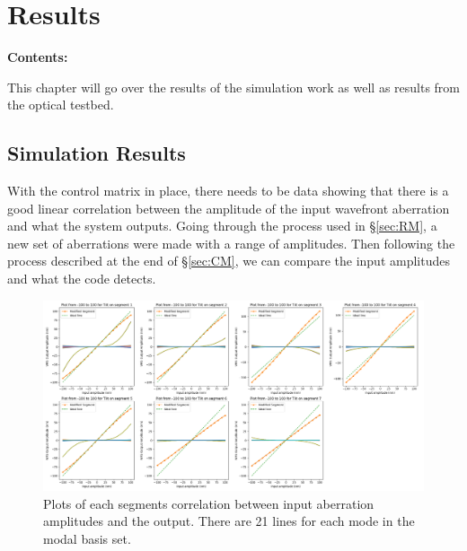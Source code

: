 \chapter{Results} %
\noindent\textbf{\large Contents:}

\noindent\hrulefill
\noindent\startcontents[chapters]
\noindent{}
\noindent\hrulefill
\label{Chapter4}


This chapter will go over the results of the simulation work as well as results from the optical testbed.

\section{Simulation Results}
\label{sec:sim}

With the control matrix in place, there needs to be data showing that there is a good linear correlation between the amplitude of the input wavefront aberration and what the system outputs.  Going through the process used in \S \ref{sec:RM}, a new set of aberrations were made with a range of amplitudes.   Then following the process described at the end of \S \ref{sec:CM}, we can compare the input amplitudes and what the code detects.  

\begin{figure}[H]
    \centering
    \includegraphics[width = 14cm]{Figures/Tilt_response100.png}
    \caption{Plots of each segments correlation between input aberration amplitudes and the output.  There are 21 lines for each mode in the modal basis set.}
    \label{fig:Tilt_100}
\end{figure}

